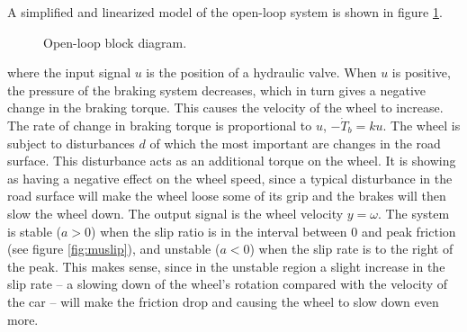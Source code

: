\documentclass[letterpaper,12pt]{scrartcl}
\begin{document}
A simplified and linearized model of the open-loop system is shown in figure \ref{fig:openloopblock}.
\begin{figure}[!h]
\begin{center}
   \caption{Open-loop block diagram.}
   \label{fig:openloopblock}
 \end{center}
\end{figure}
where the input signal $u$ is the position of a hydraulic valve. When $u$ is positive, the pressure of the braking system decreases, which in turn gives a negative change in the braking torque. This causes the velocity of the wheel to increase.  The rate of change in braking torque is proportional to $u$,  \(-\dot{T}_b = ku\). The wheel is subject to disturbances $d$ of which the most important are changes in the road surface. This disturbance acts as an additional torque on the wheel. It is showing as having a negative effect on the wheel speed, since a typical disturbance in the road surface will make the wheel loose some of its grip and the brakes will then slow the wheel down. The output signal is the wheel velocity $y = \omega$. The system is stable ($a>0$) when the slip ratio is in the interval between 0 and peak friction (see figure \ref{fig:muslip}), and unstable ($a<0$) when the slip rate is to the right of the peak. This makes sense, since in the unstable region a slight increase in the slip rate  -- a slowing down of the wheel's rotation compared with the velocity of the car -- will make the friction drop and causing the wheel to slow down even more.
\end{document}
